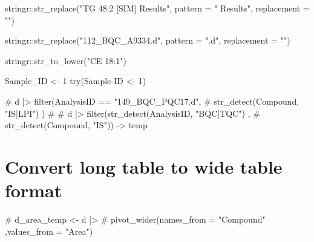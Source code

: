 \documentclass[
  letterpaper,
  DIV=11,
  numbers=noendperiod]{scrreprt}
\newenvironment{Shaded}{\begin{snugshade}}{\end{snugshade}}
\newcommand{\AttributeTok}[1]{\textcolor[rgb]{0.40,0.45,0.13}{#1}}
\newcommand{\CommentTok}[1]{\textcolor[rgb]{0.37,0.37,0.37}{#1}}
\newcommand{\DecValTok}[1]{\textcolor[rgb]{0.68,0.00,0.00}{#1}}
\newcommand{\FunctionTok}[1]{\textcolor[rgb]{0.28,0.35,0.67}{#1}}
\newcommand{\NormalTok}[1]{\textcolor[rgb]{0.00,0.23,0.31}{#1}}
\newcommand{\OtherTok}[1]{\textcolor[rgb]{0.00,0.23,0.31}{#1}}
\newcommand{\SpecialCharTok}[1]{\textcolor[rgb]{0.37,0.37,0.37}{#1}}
\newcommand{\StringTok}[1]{\textcolor[rgb]{0.13,0.47,0.30}{#1}}
\begin{document}
\begin{Shaded}
\begin{Highlighting}[]
\NormalTok{stringr}\SpecialCharTok{::}\FunctionTok{str\_replace}\NormalTok{(}\StringTok{"TG 48:2 [SIM] Results"}\NormalTok{, }
                     \AttributeTok{pattern =} \StringTok{" Results"}\NormalTok{,}
                     \AttributeTok{replacement =} \StringTok{""}\NormalTok{)}

\NormalTok{stringr}\SpecialCharTok{::}\FunctionTok{str\_replace}\NormalTok{(}\StringTok{"112\_BQC\_A9334.d"}\NormalTok{, }
                     \AttributeTok{pattern =} \StringTok{".d"}\NormalTok{,}
                     \AttributeTok{replacement =} \StringTok{""}\NormalTok{)}

\NormalTok{stringr}\SpecialCharTok{::}\FunctionTok{str\_to\_lower}\NormalTok{(}\StringTok{"CE 18:1"}\NormalTok{)}

\NormalTok{Sample\_ID }\OtherTok{\textless{}{-}} \DecValTok{1}
\FunctionTok{try}\NormalTok{(Sample}\SpecialCharTok{{-}}\NormalTok{ID }\OtherTok{\textless{}{-}} \DecValTok{1}\NormalTok{)}

\CommentTok{\# d |\textgreater{} filter(AnalysisID == "149\_BQC\_PQC17.d", }
\CommentTok{\#                    str\_detect(Compound, "IS|LPI") )}
\CommentTok{\# }
\CommentTok{\# d |\textgreater{} filter(str\_detect(AnalysisID, "BQC|TQC") , }
\CommentTok{\#                    str\_detect(Compound, "IS")) {-}\textgreater{} temp}
\end{Highlighting}
\end{Shaded}

\hypertarget{convert-long-table-to-wide-table-format}{%
\section{Convert long table to wide table
format}\label{convert-long-table-to-wide-table-format}}

\begin{Shaded}
\begin{Highlighting}[]
\CommentTok{\# d\_area\_temp \textless{}{-} d |\textgreater{} }
\CommentTok{\#   pivot\_wider(names\_from = "Compound" ,values\_from = "Area")}
\end{Highlighting}
\end{Shaded}
\end{document}
